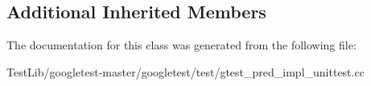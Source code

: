 \subsection*{Additional Inherited Members}


The documentation for this class was generated from the following file\+:\begin{DoxyCompactItemize}
\item 
Test\+Lib/googletest-\/master/googletest/test/gtest\+\_\+pred\+\_\+impl\+\_\+unittest.\+cc\end{DoxyCompactItemize}
